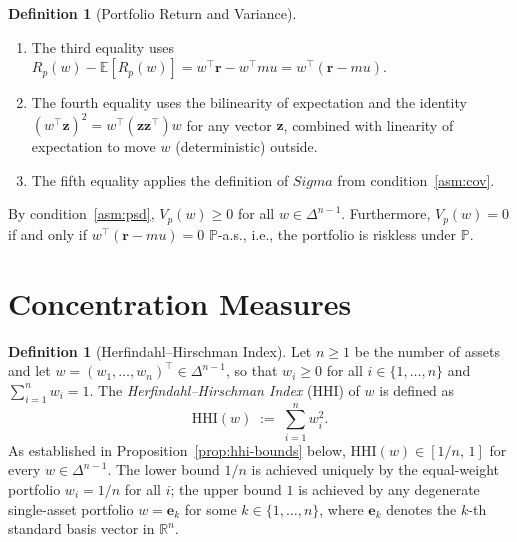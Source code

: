 \documentclass[12pt,openany]{book}
\newcommand{\E}{\mathbb{E}}
\newcommand{\Prob}{\mathbb{P}}
\newcommand{\bfw}{\mathbf{w}}
\newcommand{\bfmu}{\boldsymbol{\mu}}
\newcommand{\bfSigma}{\boldsymbol{\Sigma}}
\newcommand{\bfe}{\mathbf{e}}
\numberwithin{equation}{chapter}
\theoremstyle{plain}
\theoremstyle{definition}
\newtheorem{definition}[theorem]{Definition}
\theoremstyle{remark}
\def\bfw{w}%
\def\bfmu{mu}%
\def\bfSigma{Sigma}%
\begin{document}
\begin{definition}[Portfolio Return and Variance]
\begin{enumerate}[label=\textbf{(D\arabic*)}, leftmargin=*, widest=D2]
\begin{enumerate}[label=\textbf{(J\arabic*)},
                          leftmargin=*, widest=J3]
          \item The third equality uses
                $R_p(\bfw) - \E[R_p(\bfw)]
                = \bfw^\top\mathbf{r} - \bfw^\top\bfmu
                = \bfw^\top(\mathbf{r}-\bfmu)$.

          \item The fourth equality uses the bilinearity of
                expectation and the identity
                $(\bfw^\top \mathbf{z})^2
                = \bfw^\top(\mathbf{z}\mathbf{z}^\top)\bfw$
                for any vector $\mathbf{z}$,
                combined with linearity of expectation
                to move $\bfw$ (deterministic) outside.

          \item The fifth equality applies
                the definition of $\bfSigma$
                from condition~\eqref{asm:cov}.

        \end{enumerate}
        By condition~\eqref{asm:psd},
        $V_p(\bfw) \geq 0$ for all $\bfw \in \Delta^{n-1}$.
        Furthermore, $V_p(\bfw) = 0$ if and only if
        $\bfw^\top(\mathbf{r}-\bfmu) = 0$ $\Prob$-a.s.,
        i.e., the portfolio is riskless under $\Prob$.

\end{enumerate}
\end{definition}

\section{Concentration Measures}

\begin{definition}[Herfindahl--Hirschman Index]
\label{def:hhi}
Let $n \geq 1$ be the number of assets and let
$\bfw = (w_1, \ldots, w_n)^\top \in \Delta^{n-1}$, so that
$w_i \geq 0$ for all $i \in \{1,\ldots,n\}$ and
$\sum_{i=1}^{n} w_i = 1$.
The \emph{Herfindahl--Hirschman Index} (HHI) of $\bfw$ is defined as
\begin{equation}
  \mathrm{HHI}(\bfw)
  \;:=\;
  \sum_{i=1}^{n} w_i^2.
  \label{eq:hhi}
\end{equation}
As established in Proposition~\ref{prop:hhi-bounds} below,
$\mathrm{HHI}(\bfw) \in [1/n,\, 1]$ for every
$\bfw \in \Delta^{n-1}$.
The lower bound $1/n$ is achieved uniquely by the equal-weight
portfolio $w_i = 1/n$ for all $i$; the upper bound $1$ is achieved
by any degenerate single-asset portfolio
$\bfw = \bfe_k$ for some $k \in \{1,\ldots,n\}$,
where $\bfe_k$ denotes the $k$-th standard basis vector in
$\mathbb{R}^n$.
\end{definition}
\end{document}
